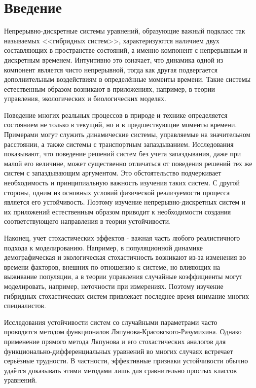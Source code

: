 \section{Введение}
Непрерывно-дискретные системы уравнений, образующие важный подкласс так называемых <<гибридных систем>>, характеризуются наличием двух составляющих в пространстве состояний, а именно компонент с непрерывным и дискретным временем. Интуитивно
это означает, что динамика одной из компонент является чисто
непрерывной, тогда как другая подвергается дополнительным
воздействиям в определённые моменты времени. Такие системы
естественным образом возникают в приложениях, например, в теории
управления, экологических   и биологических моделях.

Поведение многих реальных процессов в природе и технике определяется
состоянием не только в текущий, но и в предшествующие моменты
времени. Примерами могут служить динамические системы, управляемые
на значительном расстоянии, а также системы с транспортным
запаздыванием. Исследования показывают, что поведение решений систем
без учета запаздывания, даже при малой его величине, может
существенно отличаться от поведения решений тех же систем с
запаздывающим аргументом. Это обстоятельство подчеркивает
необходимость и принципиальную важность изучения таких систем. С
другой стороны, одним из основных условий физической реализуемости
процесса является его устойчивость. Поэтому изучение непрерывно-дискретных
систем и их приложений естественным образом приводит к необходимости
создания соответствующего направления в теории устойчивости.

Наконец, учет стохастических эффектов - важная часть любого
реалистичного подхода к моделированию. Например, в популяционной
динамике демографическая и экологическая стохастичность возникают
из-за изменения во времени факторов, внешних по отношению к системе,
но влияющих на выживание популяции, а в теории управления случайные
коэффициенты могут моделировать, например, неточности при
измерениях. Поэтому изучение гибридных стохастических систем
привлекает последнее время внимание многих специалистов.

Исследования устойчивости систем со случайными параметрами часто
проводятся методом функционалов Ляпунова-Красовского-Разумихина.
Однако применение прямого метода Ляпунова и его стохастических
аналогов для функцио\-нально-диф\-фе\-рен\-ци\-аль\-ных уравнений во
многих случаях встречает серьёзные трудности. В частности,
эффективные признаки устойчивости обычно удаётся доказывать этими
методами лишь для сравнительно простых классов уравнений.

